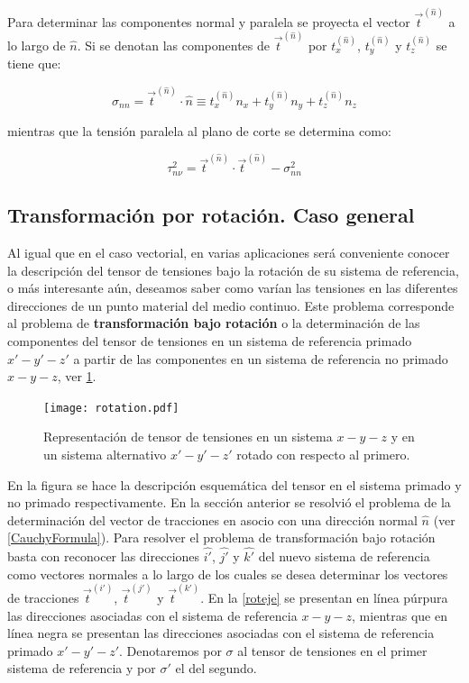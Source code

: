 \documentclass[../notas medios.tex]{subfiles}
\begin{document}
Para determinar las componentes normal y paralela se proyecta el vector ${{\vec t}^{(\hat n)}}$ a lo largo de $\hat{n}$. Si se denotan las componentes de ${{\vec t}^{(\hat n)}}$ por $t_x^{(\hat n)}$, $t_y^{(\hat n)}$  y $t_z^{(\hat n)}$  se tiene que:

\[{\sigma _{nn}} = {{\vec t}^{(\hat n)}} \cdot \hat n \equiv t_x^{(\hat n)}{n_x} + t_y^{(\hat n)}{n_y} + t_z^{(\hat n)}{n_z}\]

mientras que la tensión paralela al plano de corte se determina como:

\[\tau _{n\nu }^2 = {{\vec t}^{(\hat n)}} \cdot {{\vec t}^{(\hat n)}} - \sigma _{nn}^2\]


\subsection{Transformación por rotación. Caso general}

Al igual que en el caso vectorial, en varias aplicaciones será conveniente conocer la descripción del tensor de tensiones bajo la rotación de su
sistema de referencia, o más interesante aún, deseamos saber como varían las tensiones en las diferentes direcciones de un punto material del medio continuo. Este problema corresponde al problema de {\bf transformación bajo rotación} o la determinación de las componentes del tensor de tensiones en un sistema de referencia primado $x'-y'-z'$ a partir de las componentes en un sistema de referencia no primado $x-y-z$, ver \cref{rotation}. 


\begin{figure}[H]
\centering
	\texttt{[image: rotation.pdf]}
	\caption{Representación de tensor de tensiones en un sistema $x-y-z$ y en un sistema alternativo $x'-y'-z'$ rotado con respecto al primero.}
	\label{rotation}
\end{figure}

En la figura se hace la descripción esquemática del tensor en el sistema primado y no primado respectivamente. En la sección anterior se resolvió el problema de la determinación del vector de tracciones en asocio con una dirección normal $\hat{n}$ (ver \cref{CauchyFormula}). Para resolver el problema de transformación bajo rotación basta con reconocer las direcciones $\hat{i'}$, $\hat{j'}$ y $\hat{k'}$  del nuevo sistema de referencia como vectores normales a lo largo de los cuales se desea determinar los vectores de tracciones ${\vec t^{(i')}}$, ${\vec t^{(j')}}$ y ${\vec t^{(k')}}$. En la \cref{roteje} se presentan en línea púrpura las direcciones asociadas con el sistema de referencia $x-y-z$, mientras que en línea negra se presentan las direcciones asociadas con el sistema de referencia primado $x'-y'-z'$. Denotaremos por $\sigma$ al tensor de tensiones en el primer sistema de referencia y por $\sigma'$ el del segundo. 
\end{document}
